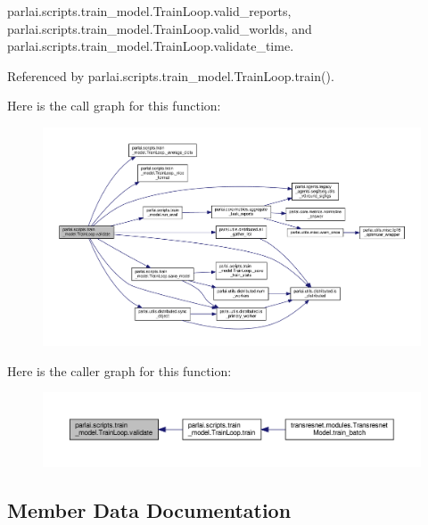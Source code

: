 parlai.\+scripts.\+train\+\_\+model.\+Train\+Loop.\+valid\+\_\+reports, parlai.\+scripts.\+train\+\_\+model.\+Train\+Loop.\+valid\+\_\+worlds, and parlai.\+scripts.\+train\+\_\+model.\+Train\+Loop.\+validate\+\_\+time.



Referenced by parlai.\+scripts.\+train\+\_\+model.\+Train\+Loop.\+train().

Here is the call graph for this function\+:
\nopagebreak
\begin{figure}[H]
\begin{center}
\leavevmode
\includegraphics[width=350pt]{classparlai_1_1scripts_1_1train__model_1_1TrainLoop_a707bb03792ef7427f5ddbb66184a9756_cgraph}
\end{center}
\end{figure}
Here is the caller graph for this function\+:
\nopagebreak
\begin{figure}[H]
\begin{center}
\leavevmode
\includegraphics[width=350pt]{classparlai_1_1scripts_1_1train__model_1_1TrainLoop_a707bb03792ef7427f5ddbb66184a9756_icgraph}
\end{center}
\end{figure}


\subsection{Member Data Documentation}
\mbox{\label{classparlai_1_1scripts_1_1train__model_1_1TrainLoop_a04b7275f3ab548989a48161a7f1b8f3c}} 
